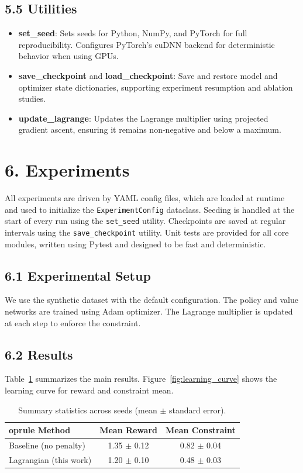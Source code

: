 \documentclass[conference]{IEEEtran}
\begin{document}
\subsection*{5.5 Utilities}
\begin{itemize}
  \item \textbf{set\_seed}: Sets seeds for Python, NumPy, and PyTorch for full reproducibility. Configures PyTorch's cuDNN backend for deterministic behavior when using GPUs.
  \item \textbf{save\_checkpoint} and \textbf{load\_checkpoint}: Save and restore model and optimizer state dictionaries, supporting experiment resumption and ablation studies.
  \item \textbf{update\_lagrange}: Updates the Lagrange multiplier using projected gradient ascent, ensuring it remains non-negative and below a maximum.
\end{itemize}


\section*{6. Experiments}
All experiments are driven by YAML config files, which are loaded at runtime and used to initialize the \texttt{ExperimentConfig} dataclass. Seeding is handled at the start of every run using the \texttt{set\_seed} utility. Checkpoints are saved at regular intervals using the \texttt{save\_checkpoint} utility. Unit tests are provided for all core modules, written using Pytest and designed to be fast and deterministic.

\subsection*{6.1 Experimental Setup}
We use the synthetic dataset with the default configuration. The policy and value networks are trained using Adam optimizer. The Lagrange multiplier is updated at each step to enforce the constraint.

\subsection*{6.2 Results}
Table~\ref{tab:results} summarizes the main results. Figure~\ref{fig:learning_curve} shows the learning curve for reward and constraint mean.
\begin{table}[ht]
\centering
\begin{tabular}{lcc}
	oprule
Method & Mean Reward & Mean Constraint \\\midrule
Baseline (no penalty) & 1.35 $\pm$ 0.12 & 0.82 $\pm$ 0.04 \\
Lagrangian (this work) & 1.20 $\pm$ 0.10 & 0.48 $\pm$ 0.03 \\
\bottomrule
\end{tabular}
\caption{Summary statistics across seeds (mean $\pm$ standard error).}
\label{tab:results}
\end{table}
\end{document}
